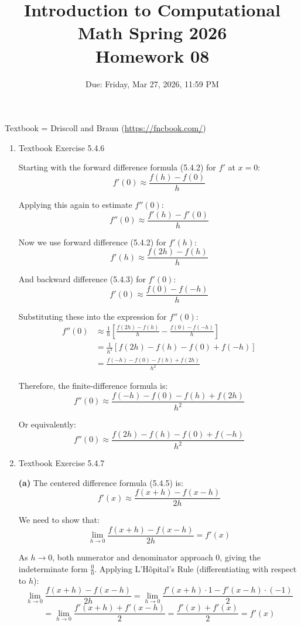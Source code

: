 \documentclass[reqno, answers]{exam}
\title{Introduction to Computational Math Spring 2026 \\ Homework 08}
\date{Due: Friday, Mar 27, 2026, 11:59 PM}
\author{}
\begin{document}
\maketitle
\thispagestyle{empty}

Textbook = Driscoll and Braun (\url{https://fncbook.com/})

\begin{enumerate}

\item Textbook Exercise 5.4.6

\begin{solution}
Starting with the forward difference formula (5.4.2) for $f'$ at $x = 0$:
$$f'(0) \approx \frac{f(h) - f(0)}{h}$$

Applying this again to estimate $f''(0)$:
$$f''(0) \approx \frac{f'(h) - f'(0)}{h}$$

Now we use forward difference (5.4.2) for $f'(h)$:
$$f'(h) \approx \frac{f(2h) - f(h)}{h}$$

And backward difference (5.4.3) for $f'(0)$:
$$f'(0) \approx \frac{f(0) - f(-h)}{h}$$

Substituting these into the expression for $f''(0)$:
\begin{align*}
f''(0) &\approx \frac{1}{h}\left[\frac{f(2h) - f(h)}{h} - \frac{f(0) - f(-h)}{h}\right]\\
&= \frac{1}{h^2}\left[f(2h) - f(h) - f(0) + f(-h)\right]\\
&= \frac{f(-h) - f(0) - f(h) + f(2h)}{h^2}
\end{align*}

Therefore, the finite-difference formula is:
$$\boxed{f''(0) \approx \frac{f(-h) - f(0) - f(h) + f(2h)}{h^2}}$$

Or equivalently:
$$\boxed{f''(0) \approx \frac{f(2h) - f(h) - f(0) + f(-h)}{h^2}}$$
\end{solution}

\item Textbook Exercise 5.4.7
\begin{solution}
\textbf{(a)} The centered difference formula (5.4.5) is:
$$f'(x) \approx \frac{f(x+h) - f(x-h)}{2h}$$

We need to show that:
$$\lim_{h \to 0} \frac{f(x+h) - f(x-h)}{2h} = f'(x)$$

As $h \to 0$, both numerator and denominator approach 0, giving the indeterminate form $\frac{0}{0}$. Applying L'Hôpital's Rule (differentiating with respect to $h$):
$$\lim_{h \to 0} \frac{f(x+h) - f(x-h)}{2h} = \lim_{h \to 0} \frac{f'(x+h) \cdot 1 - f'(x-h) \cdot (-1)}{2}$$
$$= \lim_{h \to 0} \frac{f'(x+h) + f'(x-h)}{2} = \frac{f'(x) + f'(x)}{2} = f'(x)$$


\end{solution}
\end{enumerate}
\end{document}
